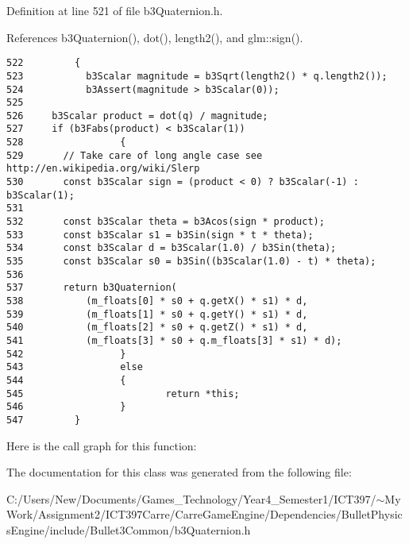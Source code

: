 Definition at line 521 of file b3Quaternion.h.

References b3Quaternion(), dot(), length2(), and glm::sign().

\begin{Code}\begin{verbatim}522         {
523           b3Scalar magnitude = b3Sqrt(length2() * q.length2()); 
524           b3Assert(magnitude > b3Scalar(0));
525 
526     b3Scalar product = dot(q) / magnitude;
527     if (b3Fabs(product) < b3Scalar(1))
528                 {
529       // Take care of long angle case see http://en.wikipedia.org/wiki/Slerp
530       const b3Scalar sign = (product < 0) ? b3Scalar(-1) : b3Scalar(1);
531 
532       const b3Scalar theta = b3Acos(sign * product);
533       const b3Scalar s1 = b3Sin(sign * t * theta);   
534       const b3Scalar d = b3Scalar(1.0) / b3Sin(theta);
535       const b3Scalar s0 = b3Sin((b3Scalar(1.0) - t) * theta);
536 
537       return b3Quaternion(
538           (m_floats[0] * s0 + q.getX() * s1) * d,
539           (m_floats[1] * s0 + q.getY() * s1) * d,
540           (m_floats[2] * s0 + q.getZ() * s1) * d,
541           (m_floats[3] * s0 + q.m_floats[3] * s1) * d);
542                 }
543                 else
544                 {
545                         return *this;
546                 }
547         }
\end{verbatim}
\end{Code}




Here is the call graph for this function:

The documentation for this class was generated from the following file:\begin{CompactItemize}
\item 
C:/Users/New/Documents/Games\_\-Technology/Year4\_\-Semester1/ICT397/$\sim$My Work/Assignment2/ICT397Carre/CarreGameEngine/Dependencies/BulletPhysicsEngine/include/Bullet3Common/b3Quaternion.h\end{CompactItemize}
